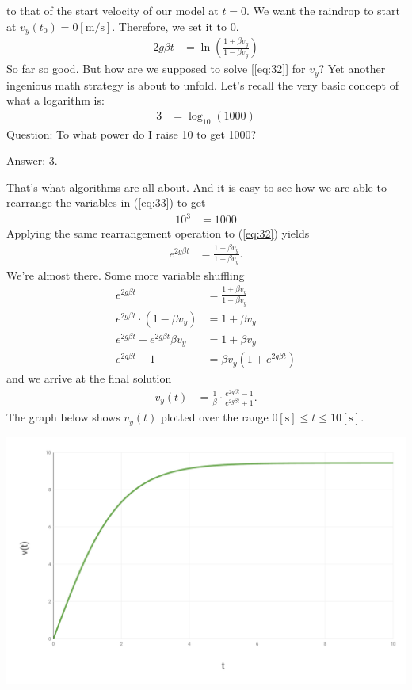 \documentclass[paper=a4, fontsize=11pt]{scrartcl} %
\numberwithin{equation}{section} %
\numberwithin{figure}{section} %
\numberwithin{table}{section} %
\begin{document}
to that of the start velocity of our model at $t = 0$. We want the raindrop to start at $v_y(t_0) = 0 [\si{\meter\per\second}]$.
Therefore, we set it to 0.
\begin{align} 
2 g \beta t &=  \ln{\left(\frac{1 + \beta v_y}{1 - \beta v_y} \right)} \label{eq:32}
\end{align}
So far so good. But how are we supposed to solve [\ref{eq:32}] for $v_y$? Yet another ingenious math strategy is about to unfold.
Let's recall the very basic concept of what a logarithm is:
\begin{align} 
3 &=  \log_{10}{(1000)} \label{eq:33}
\end{align}
Question: To what power do I raise 10 to get 1000?

Answer: 3.
\vspace{\baselineskip}

That's what algorithms are all about. And it is easy to see how we are able to rearrange the variables in (\ref{eq:33})
to get
\begin{align} 
10^3 &=  1000 \label{eq:34}
\end{align}
Applying the same rearrangement operation to (\ref{eq:32}) yields
\begin{align} 
e^{2 g \beta t} &=  \frac{1 + \beta v_y}{1 - \beta v_y}. \label{eq:35}
\end{align}
We're almost there. Some more variable shuffling 
\begin{align} 
e^{2 g \beta t} &=  \frac{1 + \beta v_y}{1 - \beta v_y} \\
e^{2 g \beta t} \cdot \left(1 - \beta v_y \right) &= 1 + \beta v_y  \\
e^{2 g \beta t} - e^{2 g \beta t}\beta v_y &= 1 + \beta v_y  \\
e^{2 g \beta t} - 1 &= \beta v_y (1 + e^{2 g \beta t})
\end{align}
and we arrive at the final solution
\begin{align}
v_y(t) &= \frac{1}{\beta} \cdot \frac{e^{2 g \beta t} - 1}{e^{2 g \beta t} + 1}.\label{eq:36}
\end{align}
The graph below shows $v_y(t)$ plotted over the range $0[\si{\second}] \leq t \leq 10[\si{\second}]$.

\includegraphics[width=.95\linewidth]{graph}
\end{document}
